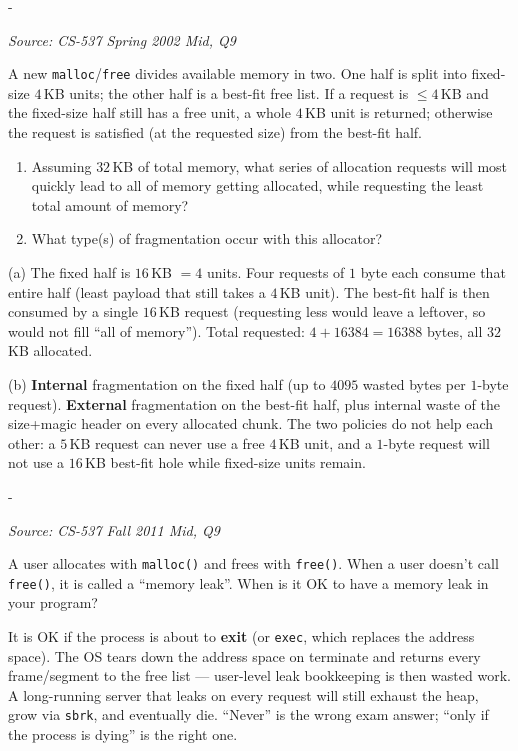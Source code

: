 \documentclass[11pt,a4paper]{article}
\makeatletter
\newcommand{\keepspace}[1]{\par\penalty-100\begingroup
  \setlength{\dimen@}{#1}\dimen@ii\pagegoal\advance\dimen@ii-\pagetotal
  \ifdim\dimen@>\dimen@ii\ifdim\dimen@ii>\z@\vfil\fi\break\fi\endgroup}
\newcounter{qn}[section]
\newenvironment{Qn}[4]{%
  \refstepcounter{qn}\keepspace{7\baselineskip}%
  \begin{tcolorbox}[qboxstyle, title={Q\thesection.\theqn\ \ [#1 \textbar\ #2]\ \ #4}]%
  {\footnotesize\color{g3}\textit{Source: #3}}\par\smallskip%
}{%
  \end{tcolorbox}%
}
\newenvironment{Sol}{%
  \begin{tcolorbox}[sboxstyle, title={Solution}]%
}{%
  \end{tcolorbox}\vspace{0.35em}%
}
\makeatother
\begin{document}
\begin{Qn}{Medium}{Lect 11}{CS-537 Spring 2002 Mid, Q9}{A hybrid allocator: 4\,KB fixed units plus a best-fit half}
A new \texttt{malloc}/\texttt{free} divides available memory in two.
One half is split into fixed-size $4$\,KB units; the other half is a
best-fit free list. If a request is $\le 4$\,KB and the fixed-size
half still has a free unit, a whole $4$\,KB unit is returned;
otherwise the request is satisfied (at the requested size) from the
best-fit half.
\begin{enumerate}
  \item[(a)] Assuming $32$\,KB of total memory, what series of
        allocation requests will most quickly lead to all of memory
        getting allocated, while requesting the least total amount of
        memory?
  \item[(b)] What type(s) of fragmentation occur with this allocator?
\end{enumerate}
\end{Qn}
\begin{Sol}
(a) The fixed half is $16$\,KB $=4$ units. Four requests of $1$ byte
each consume that entire half (least payload that still takes a
$4$\,KB unit). The best-fit half is then consumed by a single
$16$\,KB request (requesting less would leave a leftover, so would
not fill ``all of memory''). Total requested:
$4+16384=16388$ bytes, all $32$\,KB allocated.

(b) \textbf{Internal} fragmentation on the fixed half (up to
$4095$ wasted bytes per $1$-byte request). \textbf{External}
fragmentation on the best-fit half, plus internal waste of the
size+magic header on every allocated chunk. The two policies do not
help each other: a $5$\,KB request can never use a free $4$\,KB unit,
and a $1$-byte request will not use a $16$\,KB best-fit hole while
fixed-size units remain.
\end{Sol}

\begin{Qn}{Easy-Medium}{Lect 11}{CS-537 Fall 2011 Mid, Q9}{When is a memory leak OK?}
A user allocates with \texttt{malloc()} and frees with
\texttt{free()}. When a user doesn't call \texttt{free()}, it is
called a ``memory leak''. When is it OK to have a memory leak in your
program?
\end{Qn}
\begin{Sol}
It is OK if the process is about to \textbf{exit} (or \texttt{exec},
which replaces the address space). The OS tears down the address
space on terminate and returns every frame/segment to the free list
--- user-level leak bookkeeping is then wasted work. A long-running
server that leaks on every request will still exhaust the heap, grow
via \texttt{sbrk}, and eventually die. ``Never'' is the wrong exam
answer; ``only if the process is dying'' is the right one.
\end{Sol}
\end{document}
